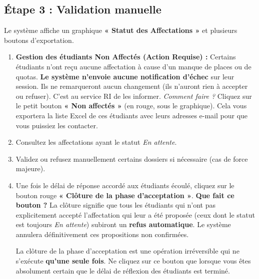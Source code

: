 \documentclass[12pt,a4paper]{article}
\begin{document}
\subsection{Étape 3 : Validation manuelle}
Le système affiche un graphique \textbf{« Statut des Affectations »} et plusieurs boutons d'exportation.
\begin{enumerate}
    \item \textbf{Gestion des étudiants Non Affectés (Action Requise) :} Certains étudiants n'ont reçu aucune affectation à cause d'un manque de places ou de quotas. \textbf{Le système n'envoie aucune notification d'échec} sur leur session. Ils ne remarqueront aucun changement (ils n'auront rien à accepter ou refuser). C'est au service RI de les informer.
    \newline \textit{Comment faire ?} Cliquez sur le petit bouton \textbf{« Non affectés »} (en rouge, sous le graphique). Cela vous exportera la liste Excel de ces étudiants avec leurs adresses e-mail pour que vous puissiez les contacter.
    \item Consultez les affectations ayant le statut \textit{En attente}.
    \item Validez ou refusez manuellement certains dossiers si nécessaire (cas de force majeure).
    \item Une fois le délai de réponse accordé aux étudiants écoulé, cliquez sur le bouton rouge \textbf{« Clôture de la phase d'acceptation »}.
    \newline \textbf{Que fait ce bouton ?} La clôture signifie que tous les étudiants qui n'ont pas explicitement accepté l'affectation qui leur a été proposée (ceux dont le statut est toujours \textit{En attente}) subiront un \textbf{refus automatique}. Le système annulera définitivement ces propositions non confirmées.
    \begin{tcolorbox}[colback=red!5!white,colframe=red!75!black,title=⚠️ ACTION CRITIQUE UNIQUE]
    La clôture de la phase d'acceptation est une opération irréversible qui ne s'exécute \textbf{qu'une seule fois}. Ne cliquez sur ce bouton que lorsque vous êtes absolument certain que le délai de réflexion des étudiants est terminé.
    \end{tcolorbox}
\end{enumerate}
\end{document}
